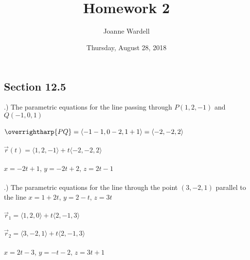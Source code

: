 \documentclass[12pt]{article}
\title{\vspace{-2.0cm}Homework 2}
\author{Joanne Wardell}
\date{Thursday, August 28, 2018}
\begin{document}
\maketitle


\subsection*{Section 12.5}
.) The parametric equations for the line passing through $P(1, 2, -1)$ and $Q(-1, 0, 1)$  \\\\
\noindent $\overrightharp{PQ} = \langle -1-1, 0-2, 1+1\rangle = \langle -2, -2, 2\rangle$\\\\
\noindent $\vec{r}(t) = \langle 1, 2, -1\rangle + t\langle -2, -2, 2\rangle$\\\\
\noindent $x = -2t +1$, \hspace{10pt} $y = -2t + 2$, \hspace{10pt} $z = 2t -1$\\\\

.) The parametric equations for the line through the point $(3, -2, 1)$ parallel to the line $x = 1 + 2t$,
\hspace{10pt} $y = 2-t$, \hspace{10pt} $z = 3t$ \\\\
\noindent $\vec{r}_{1} = \langle 1, 2, 0\rangle + t\langle 2,-1, 3\rangle$\\\\
\noindent $\vec{r}_{2} = \langle 3, -2, 1\rangle + t\langle 2, -1, 3\rangle$\\\\
\noindent $x = 2t - 3$, \hspace{10pt} $y = -t -2$, \hspace{10pt} $z = 3t + 1$\\\\
\end{document}

